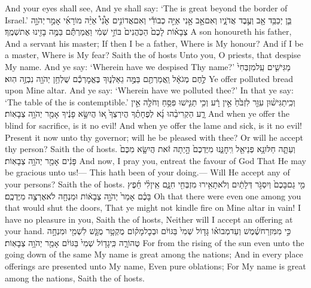 {And your eyes shall see, And ye shall say: ‘The \lord\space is great beyond the border of Israel.’}
{בֵּ֛ן יְכַבֵּ֥ד אָ֖ב וְעֶ֣בֶד אֲדֹנָ֑יו וְאִם\maqqaf אָ֣ב אָ֣נִי אַיֵּ֣ה כְבוֹדִ֡י וְאִם\maqqaf אֲדוֹנִ֣ים אָ֩נִי֩ אַיֵּ֨ה מוֹרָאִ֜י אָמַ֣ר \legarmeh  יְהֹוָ֣ה צְבָא֗וֹת לָכֶם֙ הַכֹּֽהֲנִים֙ בּוֹזֵ֣י שְׁמִ֔י וַאֲמַרְתֶּ֕ם בַּמֶּ֥ה בָזִ֖ינוּ אֶת\maqqaf שְׁמֶֽךָ׃}
{A son honoureth his father, And a servant his master; If then I be a father, Where is My honour? And if I be a master, Where is My fear? Saith the \lord\space of hosts Unto you, O priests, that despise My name. And ye say: ‘Wherein have we despised Thy name?’}
{מַגִּישִׁ֤ים עַֽל\maqqaf מִזְבְּחִי֙ לֶ֣חֶם מְגֹאָ֔ל וַֽאֲמַרְתֶּ֖ם בַּמֶּ֣ה גֵאַלְנ֑וּךָ בֶּאֱמׇרְכֶ֕ם שֻׁלְחַ֥ן יְהֹוָ֖ה נִבְזֶ֥ה הֽוּא׃}
{Ye offer polluted bread upon Mine altar. And ye say: ‘Wherein have we polluted thee?’ In that ye say: ‘The table of the \lord\space is contemptible.’}
{וְכִֽי\maqqaf תַגִּישׁ֨וּן עִוֵּ֤ר לִזְבֹּ֙חַ֙ אֵ֣ין רָ֔ע וְכִ֥י תַגִּ֛ישׁוּ פִּסֵּ֥חַ וְחֹלֶ֖ה אֵ֣ין רָ֑ע הַקְרִיבֵ֨הוּ נָ֜א לְפֶחָתֶ֗ךָ הֲיִרְצְךָ֙ א֚וֹ הֲיִשָּׂ֣א פָנֶ֔יךָ אָמַ֖ר יְהֹוָ֥ה צְבָאֽוֹת׃}
{And when ye offer the blind for sacrifice, is it no evil! And when ye offer the lame and sick, is it no evil! Present it now unto thy governor; will he be pleased with thee? Or will he accept thy person? Saith the \lord\space of hosts.}
{וְעַתָּ֛ה חַלּוּ\maqqaf נָ֥א פְנֵי\maqqaf אֵ֖ל וִֽיחׇנֵּ֑נוּ מִיֶּדְכֶם֙ הָ֣יְתָה זֹּ֔את הֲיִשָּׂ֤א מִכֶּם֙ פָּנִ֔ים אָמַ֖ר יְהֹוָ֥ה צְבָאֽוֹת׃}
{And now, I pray you, entreat the favour of God That He may be gracious unto us!— This hath been of your doing.— Will He accept any of your persons? Saith the \lord\space of hosts.}
{מִ֤י גַם\maqqaf בָּכֶם֙ וְיִסְגֹּ֣ר דְּלָתַ֔יִם וְלֹא\maqqaf תָאִ֥ירוּ מִזְבְּחִ֖י חִנָּ֑ם אֵֽין\maqqaf לִ֨י חֵ֜פֶץ בָּכֶ֗ם אָמַר֙ יְהֹוָ֣ה צְבָא֔וֹת וּמִנְחָ֖ה לֹא\maqqaf אֶרְצֶ֥ה מִיֶּדְכֶֽם׃}
{Oh that there were even one among you that would shut the doors, That ye might not kindle fire on Mine altar in vain! I have no pleasure in you, Saith the \lord\space of hosts, Neither will I accept an offering at your hand.}
{כִּ֣י מִמִּזְרַח\maqqaf שֶׁ֜מֶשׁ וְעַד\maqqaf מְבוֹא֗וֹ גָּד֤וֹל שְׁמִי֙ בַּגּוֹיִ֔ם וּבְכׇל\maqqaf מָק֗וֹם מֻקְטָ֥ר מֻגָּ֛שׁ לִשְׁמִ֖י וּמִנְחָ֣ה טְהוֹרָ֑ה כִּֽי\maqqaf גָד֤וֹל שְׁמִי֙ בַּגּוֹיִ֔ם אָמַ֖ר יְהֹוָ֥ה צְבָאֽוֹת׃}
{For from the rising of the sun even unto the going down of the same My name is great among the nations; And in every place offerings are presented unto My name, Even pure oblations; For My name is great among the nations, Saith the \lord\space of hosts.}
